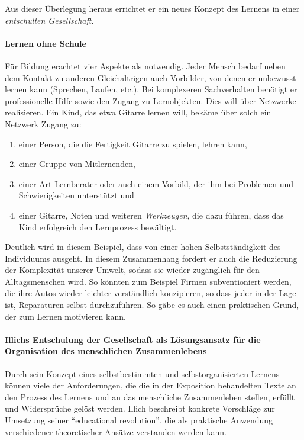 Aus dieser Überlegung heraus errichtet er ein neues Konzept des Lernens in einer \emph{entschulten Gesellschaft}.


\paragraph{Lernen ohne Schule}

Für Bildung erachtet \citeauthor{Illich-1971} vier Aspekte als notwendig.
Jeder Mensch bedarf neben dem Kontakt zu anderen Gleichaltrigen auch Vorbilder, von denen er unbewusst lernen kann (Sprechen, Laufen, etc.).
Bei komplexeren Sachverhalten benötigt er professionelle Hilfe sowie den Zugang zu Lernobjekten.
Dies will \citeauthor{Illich-1971} über Netzwerke realisieren.
Ein Kind, das etwa Gitarre lernen will, bekäme über solch ein Netzwerk Zugang zu:

\begin{enumerate}
		\item einer Person, die die Fertigkeit Gitarre zu spielen, lehren kann,
		\item einer Gruppe von Mitlernenden,
		\item einer Art Lernberater oder auch einem Vorbild, der ihm bei Problemen und Schwierigkeiten unterstützt und
		\item einer Gitarre, Noten und weiteren \emph{Werkzeugen}, die dazu führen, dass das Kind erfolgreich den Lernprozess bewältigt.
\end{enumerate}

Deutlich wird in diesem Beispiel, dass \citeauthor{Illich-1971} von einer hohen Selbstständigkeit des Individuums ausgeht.
In diesem Zusammenhang fordert er auch die Reduzierung der Komplexität unserer Umwelt, sodass sie wieder zugänglich für den Alltagsmenschen wird.
So könnten zum Beispiel Firmen subventioniert werden, die ihre Autos wieder leichter verständlich konzipieren, so dass jeder in der Lage ist, Reparaturen selbst durchzuführen.
So gäbe es auch einen praktischen Grund, der zum Lernen motivieren kann.


\paragraph{Illichs Entschulung der Gesellschaft als Lösungsansatz für die Organisation des menschlichen Zusammenlebens}

Durch sein Konzept eines selbstbestimmten und selbstorganisierten Lernens können viele der Anforderungen, die die in der Exposition behandelten Texte an den Prozess des Lernens und an das menschliche Zusammenleben stellen, erfüllt und Widersprüche gelöst werden.
Illich beschreibt konkrete Vorschläge zur Umsetzung seiner ``educational revolution'', die als praktische Anwendung verschiedener theoretischer Ansätze verstanden werden kann.

